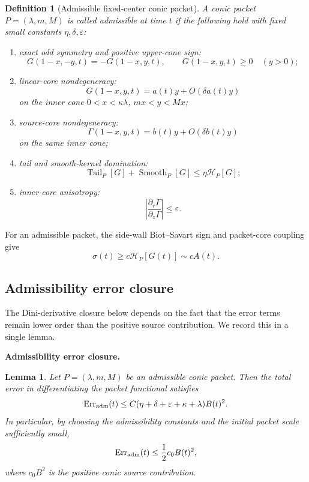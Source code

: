 \documentclass[11pt]{amsart}
\newtheorem{lemma}[theorem]{Lemma}
\newtheorem{definition}[theorem]{Definition}
\newcommand{\Tail}{\operatorname{Tail}}
\begin{document}
\begin{definition}[Admissible fixed-center conic packet]\label{def:admissible_conic_packet}
A conic packet \(P=(\lambda,m,M)\) is called admissible at time \(t\) if the following hold with fixed small constants \(\eta,\delta,\varepsilon\):
\begin{enumerate}[label=(\roman*)]
\item exact odd symmetry and positive upper-cone sign:
\[
G(1-x,-y,t)=-G(1-x,y,t),
\qquad
G(1-x,y,t)\ge0\quad(y>0);
\]
\item linear-core nondegeneracy:
\[
G(1-x,y,t)=a(t)y+O(\delta a(t)y)
\]
on the inner cone \(0<x<\kappa\lambda\), \(mx<y<Mx\);
\item source-core nondegeneracy:
\[
\Gamma(1-x,y,t)=b(t)y+O(\delta b(t)y)
\]
on the same inner cone;
\item tail and smooth-kernel domination:
\[
\Tail_P[G]+\operatorname{Smooth}_P[G]\le \eta\mathcal H_P[G];
\]
\item inner-core anisotropy:
\[
\left|\frac{\partial_r\Gamma}{\partial_z\Gamma}\right|\le \varepsilon.
\]
\end{enumerate}
\end{definition}

For an admissible packet, the side-wall Biot--Savart sign and packet-core coupling give
\begin{equation}\label{eq:sigma_M_admissible}
\sigma(t)\ge c\mathcal H_P[G(t)]
\sim cA(t).
\end{equation}

\subsection{Admissibility error closure}

The Dini-derivative closure below depends on the fact that the error terms remain lower order than the positive source contribution.  We record this in a single lemma.

\medskip
\noindent\textbf{Admissibility error closure.}
\begin{lemma}\label{lem:admissibility_error_closure}
Let \(P=(\lambda,m,M)\) be an admissible conic packet.  Then the total error in differentiating the packet functional satisfies
\begin{equation}\label{eq:Err_adm_bound_final}
\operatorname{Err}_{\rm adm}(t)
\le
C(\eta+\delta+\varepsilon+\kappa+\lambda)B(t)^2.
\end{equation}
In particular, by choosing the admissibility constants and the initial packet scale sufficiently small,
\begin{equation}\label{eq:Err_adm_absorb_final}
\operatorname{Err}_{\rm adm}(t)
\le
\frac12 c_0B(t)^2,
\end{equation}
where \(c_0B^2\) is the positive conic source contribution.
\end{lemma}
\end{document}
